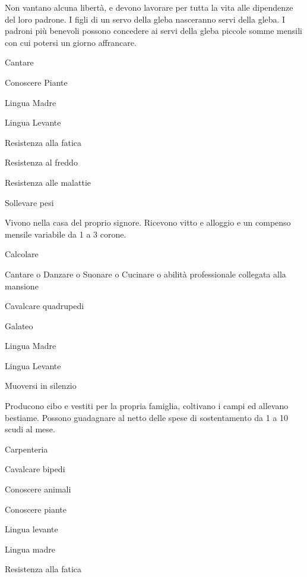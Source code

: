 
Non vantano alcuna libert\`a, e devono lavorare per tutta la vita alle
dipendenze del loro padrone. I figli di un servo della gleba
nasceranno servi della gleba.  I padroni pi\`u benevoli possono
concedere ai servi della gleba piccole somme mensili con cui potersi
un giorno affrancare.

\begin{abilist}
\item Cantare
\item Conoscere Piante
\item Lingua Madre
\item Lingua Levante
\item Resistenza alla fatica
\item Resistenza al freddo
\item Resistenza alle malattie
\item Sollevare pesi
\end{abilist}



Vivono nella casa del proprio signore. Ricevono vitto e alloggio e un
compenso mensile variabile da 1 a 3 corone.

\begin{abilist}
\item Calcolare
\item Cantare o Danzare o Suonare o Cucinare o abilit\`a professionale
  collegata alla mansione
\item Cavalcare quadrupedi
\item Galateo
\item Lingua Madre
\item Lingua Levante
\item Muoversi in silenzio
\end{abilist}


Producono cibo e vestiti per la propria famiglia, coltivano i campi ed
allevano bestiame. Possono guadagnare al netto delle spese di
sostentamento da 1 a 10 scudi al mese.

\begin{abilist}
\item Carpenteria 
\item Cavalcare bipedi
\item Conoscere animali 
\item Conoscere piante
\item Lingua levante
\item Lingua madre
\item Resistenza alla fatica
\end{abilist}

